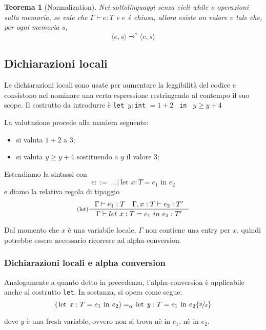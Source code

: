 \documentclass[a4paper, 11pt]{article}
\newtheorem{thm}{Teorema}[section]
\newcommand{\type}{\Gamma \vdash}
\newcommand{\code}[1]{\textup{\lstinline|#1|}}
\newcommand{\subs}[3]{#1 \lbrace \sfrac{#2}{#3} \rbrace}
\begin{document}
\begin{thm}[Normalization]
	Nei sottolinguaggi senza cicli while o operazioni sulla memoria, se vale che $\type e:T$ e $e$ è chiusa, allora esiste un valore $v$ tale che, per ogni memoria $s$, \[ \langle e,s \rangle \rightarrowtriangle^\ast \langle v,s \rangle \]
\end{thm}

\subsection{Dichiarazioni locali}
Le dichiarazioni locali sono usate per aumentare la leggibilità del codice e consistono nel nominare una certa espressione restringendo al contempo il suo scope. Il costrutto da introdurre è \lstinline|let |$y:$\lstinline|int| $=1+2$ \lstinline| in |  $y \geq y+4$

La valutazione procede alla maniera seguente:
\begin{itemize}
	\item si valuta $1+2$ a $3$;
	\item si valuta $y \geq y+4$ sostituendo a $y$ il valore $3$;
\end{itemize}

Estendiamo la sintassi con 
\[ 
	e::=\ \dots |\ \text{let } x:T = e_1\text{ in } e_2  
\] 
e diamo la relativa regola di tipaggio 
\[ 
	\inference[(let)]{\type e_1:T \quad \Gamma,x:T \vdash e_2:T'}{\type let\ x:T = e_1\ in\ e_2:T'} 
\]

Dal momento che $x$ è una variabile locale, $\Gamma$ non contiene una entry per $x$, quindi potrebbe essere necessario ricorrere ad alpha-conversion.

\subsubsection{Dichiarazioni locali e alpha conversion}
Analogamente a quanto detto in precedenza, l'alpha-conversion è applicabile anche al costrutto \lstinline|let|.
In sostanza, si opera come segue: \[ (\code{let}\ x:T = e_1\ \code{in}\ e_2) =_\alpha \code{let}\ y:T = e_1\ \code{in}\ \subs{e_2}{y}{x} \]

dove $y$ è una fresh variable, ovvero non si trova nè in $e_1$, nè in $e_2$.
\end{document}
